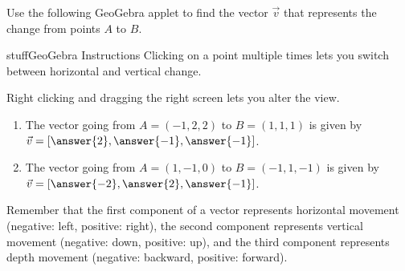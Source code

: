 \documentclass{ximera}
\begin{document}
\begin{problem}
    Use the following GeoGebra applet to find the vector $\vec{v}$ that represents the change from points $A$ to $B$. 
    
    \begin{expandable}{stuff}{GeoGebra Instructions}
        Clicking on a point multiple times lets you switch between horizontal and vertical change. 
        
        Right clicking and dragging the right screen lets you alter the view.
    \end{expandable}

    \begin{center}
    \end{center}

    \begin{enumerate}
        \item The vector going from $A=(-1,2,2)$ to $B=(1,1,1)$ is given by $\vec{v}=[\answer{2},\answer{-1},\answer{-1}]$.
        \item The vector going from $A=(1,-1,0)$ to $B=(-1,1,-1)$ is given by $\vec{v}=[\answer{-2},\answer{2},\answer{-1}]$.
    \end{enumerate}
    \begin{feedback}
        Remember that the first component of a vector represents horizontal movement (negative: left, positive: right), the second component represents vertical movement (negative: down, positive: up), and the third component represents depth movement (negative: backward, positive: forward).
    \end{feedback}
\end{problem}
\end{document}
